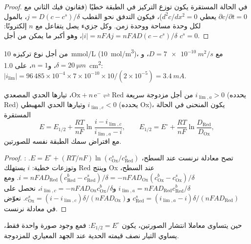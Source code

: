 \begin{proof}
في الحالة المستقرة يكون توزع التركيز في الطبقة خطيًا (فقانون فيك
الثاني مع $\partial c/\partial t = 0$ يعطي $d^2c/dx^2 = 0$)، فيكون التدفق
نحو القطب $j = D(c - c^s)/\delta$، بالمول لكل وحدة مساحة ووحدة
زمن. وكل جزيء يصل يتفاعل مع $n$ إلكترونًا: $|i| = nFAj =
nFAD(c - c^s)/\delta$، وهو أكبر ما يمكن من أجل $c^s = 0$.
\end{proof}

\begin{example}\label{ex:b2:current-potential-curves:ilim}
من أجل نوع تركيزه \qty{10}{mmol/L} (\qty{10}{mol/m^3})، مع $D =
\qty{7e-10}{m^2/s}$، و$\delta = \qty{20}{\micro m}$، و$n = 1$، على
\qty{1.0}{cm^2}: $|i_{\lim}| = 96\,485 \times 10^{-4} \times 7 \times 10^{-10}
\times 10/(2 \times 10^{-5}) = \qty{3.4}{mA}$.
\end{example}

\begin{theorem}\label{thm:b2:current-potential-curves:wave}
من أجل مزدوجة سريعة $\mathrm{Ox} + n\,\mathrm e^- \rightleftharpoons \mathrm{Red}$،
تيارها الحدي المصعدي $i_{\lim,a} > 0$ (يحدده Red) وتيارها الحدي
المهبطي $i_{\lim,c} < 0$ (يحدده Ox)، يكون المنحنى في الحالة المستقرة
\[
  E = E_{1/2} + \frac{RT}{nF}\ln\frac{i - i_{\lim,c}}{i_{\lim,a} - i},
  \qquad E_{1/2} = E^\circ + \frac{RT}{nF}\ln\frac{D_{\text{Red}}}{D_{\text{Ox}}} ,
\]
مع افتراض سمك الطبقة نفسه للصورتين.
\end{theorem}

\begin{proof}
: تصح معادلة نرنست عند السطح، $E = E^\circ + (RT/nF)
\ln(c^s_{\text{Ox}}/c^s_{\text{Red}})$. وتوزعات خطية:  $i$
يستهلك Red وينتج Ox عند السطح، $i = nFAD_{\text{Red}}(c^b_{\text{Red}}
- c^s_{\text{Red}})/\delta = -nFAD_{\text{Ox}}(c^b_{\text{Ox}} - c^s_{\text{Ox}})/\delta$.
ومع $i_{\lim,a} = nFAD_{\text{Red}}c^b_{\text{Red}}/\delta$ و$i_{\lim,c} =
-nFAD_{\text{Ox}}c^b_{\text{Ox}}/\delta$، نحصل على $c^s_{\text{Red}} = (i_{\lim,a} -
i)\delta/(nFAD_{\text{Red}})$ و$c^s_{\text{Ox}} = (i - i_{\lim,c})\delta/(nFAD_{\text{Ox}})$.
نعوّض في معادلة نرنست.
\end{proof}

\begin{corollary}\label{cor:b2:current-potential-curves:half-wave}
حين يتساوى معاملا انتشار الصورتين، يكون $E_{1/2} = E^\circ$: فمع
وجود صورة واحدة فقط، يساوي التيار نصف قيمته الحدية عند الجهد
المعياري للمزدوجة.
\end{corollary}

